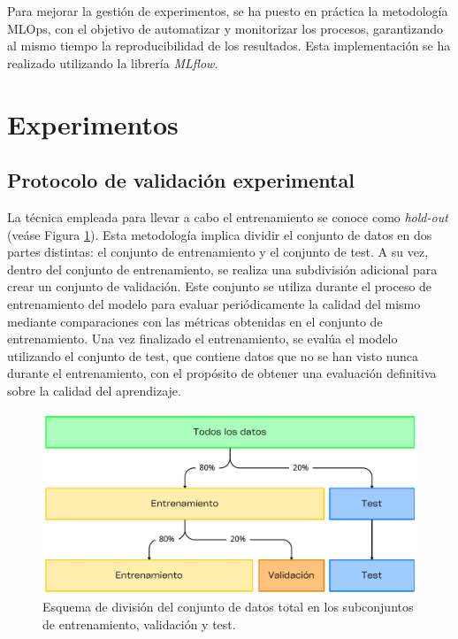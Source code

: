 Para mejorar la gestión de experimentos, se ha puesto en práctica la metodología MLOps, con el objetivo de automatizar y monitorizar los procesos, garantizando al mismo tiempo la reproducibilidad de los resultados. Esta implementación se ha realizado utilizando la librería \textit{MLflow}.

\section{Experimentos}

\subsection{Protocolo de validación experimental}

La técnica empleada para llevar a cabo el entrenamiento se conoce como \textit{hold-out} (veáse Figura \ref{fig27}). Esta metodología implica dividir el conjunto de datos en dos partes distintas: el conjunto de entrenamiento y el conjunto de test. A su vez, dentro del conjunto de entrenamiento, se realiza una subdivisión adicional para crear un conjunto de validación. Este conjunto se utiliza durante el proceso de entrenamiento del modelo para evaluar periódicamente la calidad del mismo mediante comparaciones con las métricas obtenidas en el conjunto de entrenamiento. Una vez finalizado el entrenamiento, se evalúa el modelo utilizando el conjunto de test, que contiene datos que no se han visto nunca durante el entrenamiento, con el propósito de obtener una evaluación definitiva sobre la calidad del aprendizaje.

\begin{figure}[h]
	\centering
	\includegraphics[scale=0.55]{imagenes/cap5/hold-out.png}
	\caption[Esquema de división del conjunto de datos.]{Esquema de división del conjunto de datos total en los subconjuntos de entrenamiento, validación y test.}
	\label{fig27}
\end{figure}

